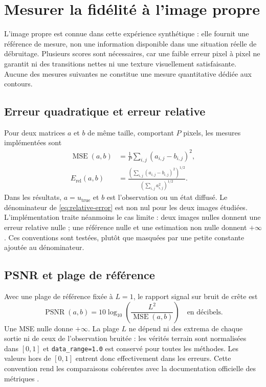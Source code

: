 \section{Mesurer la fidélité à l'image propre}
\label{sec:metrics}

L'image propre est connue dans cette expérience synthétique : elle fournit
une référence de mesure, non une information disponible dans une situation
réelle de débruitage. Plusieurs scores sont nécessaires, car une faible
erreur pixel à pixel ne garantit ni des transitions nettes ni une texture
visuellement satisfaisante. Aucune des mesures suivantes ne constitue une
mesure quantitative dédiée aux contours.

\subsection{Erreur quadratique et erreur relative}

Pour deux matrices $a$ et $b$ de même taille, comportant $P$ pixels, les
mesures implémentées sont
\begin{align}
 \operatorname{MSE}(a,b)
   &=\frac{1}{P}\sum_{i,j}(a_{i,j}-b_{i,j})^2,
   \label{eq:mse}\\
 E_{\mathrm{rel}}(a,b)
   &=\frac{\left(\sum_{i,j}(a_{i,j}-b_{i,j})^2\right)^{1/2}}
           {\left(\sum_{i,j}a_{i,j}^2\right)^{1/2}}.
   \label{eq:relative-error}
\end{align}
Dans les résultats, $a=u_{\mathrm{true}}$ et $b$ est l'observation ou un
état diffusé. Le dénominateur de \eqref{eq:relative-error} est non nul
pour les deux images étudiées. L'implémentation traite néanmoins le cas
limite : deux images nulles donnent une erreur relative nulle ; une
référence nulle et une estimation non nulle donnent $+\infty$.
Ces conventions sont testées, plutôt que masquées par une petite constante
ajoutée au dénominateur.

\subsection{PSNR et plage de référence}

Avec une plage de référence fixée à $L=1$, le rapport signal sur bruit de
crête est
\begin{equation}
 \operatorname{PSNR}(a,b)
   =10\log_{10}\!\left(\frac{L^2}{\operatorname{MSE}(a,b)}\right)
   \quad\text{en décibels}.
 \label{eq:psnr}
\end{equation}
Une MSE nulle donne $+\infty$. La plage $L$ ne dépend ni des extrema de
chaque sortie ni de ceux de l'observation bruitée : les vérités terrain
sont normalisées dans $[0,1]$ et \texttt{data\_range=1.0} est conservé
pour toutes les méthodes. Les valeurs hors de $[0,1]$ entrent donc
effectivement dans les erreurs. Cette convention rend les comparaisons
cohérentes avec la documentation officielle des métriques
\cite{skimage_metrics}.

